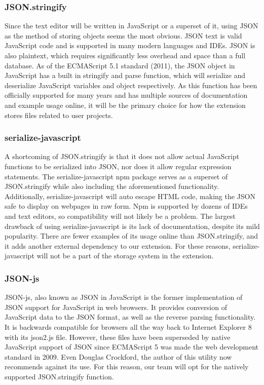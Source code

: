 \documentclass[letterpaper,10pt,titlepage,draftclsnofoot,onecolumn,onesided] {IEEEtran}
\begin{document}
\subsubsection{JSON.stringify}
Since the text editor will be written in JavaScript or a superset of it, using JSON as the method of storing objects seems the most obvious. 
JSON text is valid JavaScript code and is supported in many modern languages and IDEs. 
JSON is also plaintext, which requires significantly less overhead and space than a full database. 
As of the ECMAScript 5.1 standard (2011), the JSON object in JavaScript has a built in stringify and parse function, which will serialize and deserialize JavaScript variables and object respectively. 
As this function has been officially supported for many years and has multiple sources of documentation and example usage online, it will be the primary choice for how the extension stores files related to user projects. \cite{stringify}

\subsubsection{serialize-javascript}
A shortcoming of JSON.stringify is that it does not allow actual JavaScript functions to be serialized into JSON, nor does it allow regular expression statements. 
The serialize-javascript npm package serves as a superset of JSON.stringify while also including the aforementioned functionality. 
Additionally, serialize-javascript will auto escape HTML code, making the JSON  safe to display on webpages in raw form. 
Npm is supported by dozens of IDEs and text editors, so compatibility will not likely be a problem. 
The largest drawback of using serialize-javascript is its lack of documentation, despite its mild popularity. 
There are fewer examples of its usage online than JSON.stringify, and it adds another external dependency to our extension. 
For these reasons, serialize-javascript will not be a part of the storage system in the extension. \cite{serialize}

\subsubsection{JSON-js}
JSON-js, also known as JSON in JavaScript is the former implementation of JSON support for JavaScript in web browsers. It provides conversion of JavaScript data to the JSON format, as well as the reverse parsing functionality. 
It is backwards compatible for browsers all the way back to Internet Explorer 8 with its json2.js file. 
However, these files have been superseded by native JavaScript support of JSON since ECMAScript 5 was made the web development standard in 2009. Even Douglas Crockford, the author of this utility now recommends against its use. 
For this reason, our team will opt for the natively supported JSON.stringify function. \cite{json2js}
\end{document}
